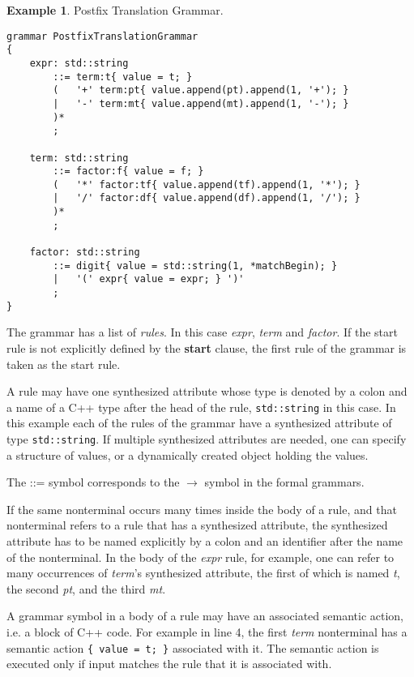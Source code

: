 \documentclass[a4paper,oneside,11pt]{book}
\theoremstyle{definition}
\newtheorem{exmp}{Example}[section]
\begin{document}
\clearpage
\begin{exmp} Postfix Translation Grammar.\label{ex:postfix}
\lstset{language=cmpg}
\begin{lstlisting}
grammar PostfixTranslationGrammar
{
    expr: std::string
        ::= term:t{ value = t; }
        (   '+' term:pt{ value.append(pt).append(1, '+'); }
        |   '-' term:mt{ value.append(mt).append(1, '-'); }
        )*
        ;

    term: std::string
        ::= factor:f{ value = f; }
        (   '*' factor:tf{ value.append(tf).append(1, '*'); }
        |   '/' factor:df{ value.append(df).append(1, '/'); }
        )*
        ;

    factor: std::string
        ::= digit{ value = std::string(1, *matchBegin); }
        |   '(' expr{ value = expr; } ')'
        ;
}
\end{lstlisting}

The grammar has a list of \emph{rules}. In this case \emph{expr}, \emph{term} and \emph{factor}.
If the start rule is not explicitly defined by the \textbf{start} clause, the first rule of the grammar
is taken as the start rule.

A rule may have one synthesized attribute whose type is denoted by a colon and a name of a C++ type after
the head of the rule, \verb|std::string| in this case. In this example each of the rules of the grammar have a
synthesized attribute of type \verb|std::string|.
If multiple synthesized attributes are needed, one can specify a structure of values,
or a dynamically created object holding the values.

The ::= symbol corresponds to the $\rightarrow$ symbol in the formal grammars.

If the same nonterminal occurs many times inside the body of a rule, and that nonterminal refers to a rule that has a synthesized attribute,
the synthesized attribute has to be named explicitly by a colon and an identifier after the name of the nonterminal.
In the body of the \emph{expr} rule, for example, one can refer to many occurrences of \emph{term}'s synthesized attribute,
the first of which is named \emph{t}, the second \emph{pt}, and the third \emph{mt}.

A grammar symbol in a body of a rule may have an associated semantic action, i.e. a block of C++ code.
For example in line 4, the first \emph{term} nonterminal has a semantic action \verb|{ value = t; }| associated with it.
The semantic action is executed only if input matches the rule that it is associated with.


\end{exmp}
\end{document}
